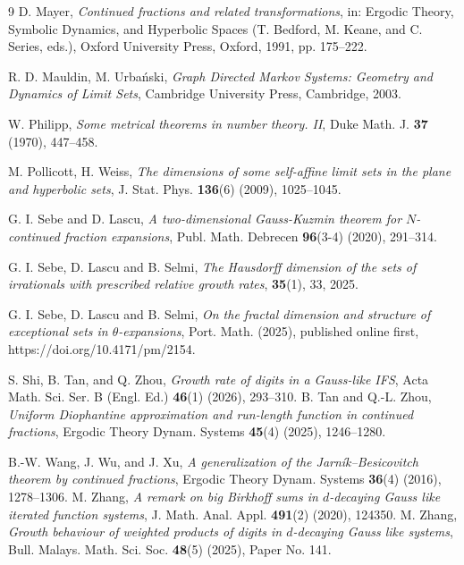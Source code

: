 \documentclass[12pt]{article}
\numberwithin{equation}{section}
\begin{document}
\begin{thebibliography}{9}
{
D. Mayer,
\textit{Continued fractions and related transformations},
in: Ergodic Theory, Symbolic Dynamics, and Hyperbolic Spaces
(T. Bedford, M. Keane, and C. Series, eds.),
Oxford University Press, Oxford, 1991, pp. 175--222.}


{
R. D. Mauldin, M. Urbański,
\textit{Graph Directed Markov Systems: Geometry and Dynamics of Limit Sets},
Cambridge University Press, Cambridge, 2003.}



{
W. Philipp,
\textit{Some metrical theorems in number theory. II},
Duke Math. J. \textbf{37} (1970), 447--458.}


{
M. Pollicott, H. Weiss,
\textit{The dimensions of some self-affine limit sets in the plane and hyperbolic sets},
J. Stat. Phys. \textbf{136}(6) (2009), 1025--1045.}

G. I. Sebe and D. Lascu,
\textit{A two-dimensional Gauss-Kuzmin theorem for $N$-continued fraction expansions},
Publ. Math. Debrecen \textbf{96}(3-4) (2020), 291--314.

G. I. Sebe, D. Lascu and B. Selmi,
\textit{The Hausdorff dimension of the sets of irrationals with prescribed relative growth rates},  
\textbf{35}(1), 33, 2025.

G. I. Sebe, D. Lascu and B. Selmi,
\textit{On the fractal dimension and structure of exceptional sets in $\theta$-expansions},  
Port. Math. (2025), published online first, https://doi.org/10.4171/pm/2154.

{
S. Shi, B. Tan, and Q. Zhou,
\textit{Growth rate of digits in a Gauss-like IFS},
Acta Math. Sci. Ser. B (Engl. Ed.) \textbf{46}(1) (2026), 293--310.
%
B. Tan and Q.-L. Zhou,
\textit{Uniform Diophantine approximation and run-length function in continued fractions},
Ergodic Theory Dynam. Systems
\textbf{45}(4) (2025), 1246--1280.
%

{
B.-W. Wang, J. Wu, and J. Xu,
\textit{A generalization of the Jarn\'ik--Besicovitch theorem by continued fractions},
Ergodic Theory Dynam. Systems \textbf{36}(4) (2016), 1278--1306.}
M. Zhang,
\textit{A remark on big Birkhoff sums in $d$-decaying Gauss like iterated function systems},
J. Math. Anal. Appl. \textbf{491}(2) (2020), 124350.
%
M. Zhang,
\textit{Growth behaviour of weighted products of digits in $d$-decaying Gauss like systems},
Bull. Malays. Math. Sci. Soc. \textbf{48}(5) (2025), Paper No. 141.
}
\end{thebibliography}
\end{document}
